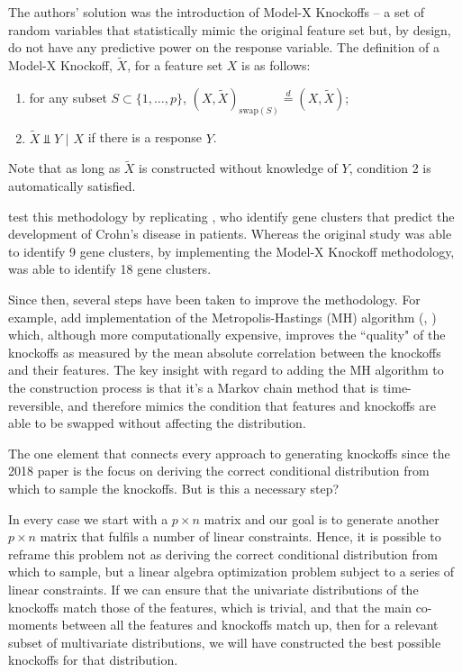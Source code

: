 \documentclass[review]{elsarticle}
\begin{document}
The authors' solution was the introduction of Model-X Knockoffs – a set of random variables that statistically mimic the original feature set but, by design, do not have any predictive power on the response variable. The definition of a Model-X Knockoff, $\tilde{X}$, for a feature set $X$ is as follows:

\begin{enumerate}
\item for any subset $S\subset\{1,\dots,p\}$, $(X,\tilde{X})_{\text{swap}(S)}\stackrel{d}{=}(X,\tilde{X})$;
\item $\tilde{X}\Perp Y$ $|$ $X$ if there is a response $Y$.
\end{enumerate}

Note that as long as $\tilde{X}$ is constructed without knowledge of $Y$, condition 2 is automatically satisfied.

\citet{candes2018panning} test this methodology by replicating \citet{wellcome2007genome}, who identify gene clusters that predict the development of Crohn's disease in patients. Whereas the original study was able to identify 9 gene clusters, by implementing the Model-X Knockoff methodology, \citet{candes2018panning} was able to identify 18 gene clusters.

Since then, several steps have been taken to improve the methodology. For example, \citet{bates2021metropolized} add implementation of the Metropolis-Hastings (MH) algorithm (\citet{metropolis1953equation}, \citet{hastings1970monte}) which, although more computationally expensive, improves the ``quality" of the knockoffs as measured by the mean absolute correlation between the knockoffs and their features. The key insight with regard to adding the MH algorithm to the construction process is that it's a Markov chain method that is time-reversible, and therefore mimics the condition that features and knockoffs are able to be swapped without affecting the distribution.

The one element that connects every approach to generating knockoffs since the 2018 paper is the focus on deriving the correct conditional distribution from which to sample the knockoffs. But is this a necessary step?

In every case we start with a $p\times n$ matrix and our goal is to generate another $p\times n$ matrix that fulfils a number of linear constraints. Hence, it is possible to reframe this problem not as deriving the correct conditional distribution from which to sample, but a linear algebra optimization problem subject to a series of linear constraints. If we can ensure that the univariate distributions of the knockoffs match those of the features, which is trivial, and that the main co-moments between all the features and knockoffs match up, then for a relevant subset of multivariate distributions, we will have constructed the best possible knockoffs for that distribution.
\end{document}
